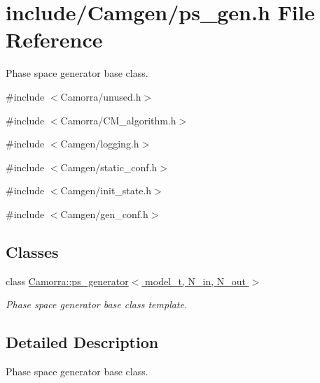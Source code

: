 \hypertarget{a00583}{
\section{include/Camgen/ps\_\-gen.h File Reference}
\label{a00583}
}


Phase space generator base class.  


{\ttfamily \#include $<$Camorra/unused.h$>$}\par
{\ttfamily \#include $<$Camorra/CM\_\-algorithm.h$>$}\par
{\ttfamily \#include $<$Camgen/logging.h$>$}\par
{\ttfamily \#include $<$Camgen/static\_\-conf.h$>$}\par
{\ttfamily \#include $<$Camgen/init\_\-state.h$>$}\par
{\ttfamily \#include $<$Camgen/gen\_\-conf.h$>$}\par
\subsection*{Classes}
\begin{DoxyCompactItemize}
\item 
class \hyperlink{a00407}{Camorra::ps\_\-generator$<$ model\_\-t, N\_\-in, N\_\-out $>$}
\begin{DoxyCompactList}\small\item\em Phase space generator base class template. \end{DoxyCompactList}\end{DoxyCompactItemize}


\subsection{Detailed Description}
Phase space generator base class. 